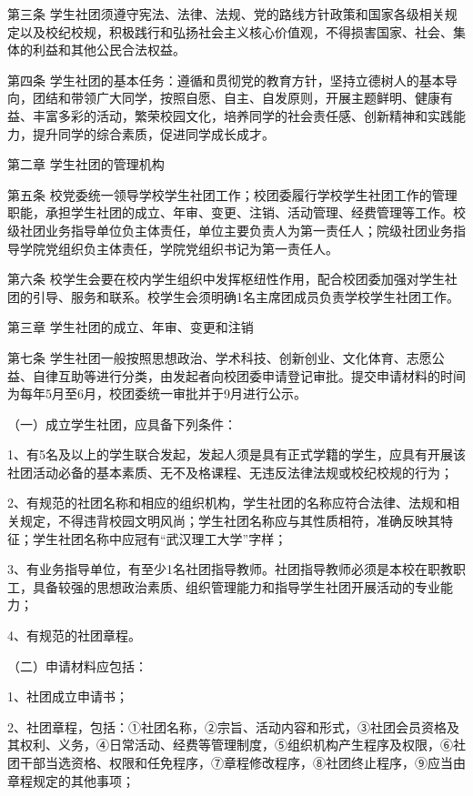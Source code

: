 \documentclass[UTF8,12pt,a4paper]{report}
\begin{document}
第三条  学生社团须遵守宪法、法律、法规、党的路线方针政策和国家各级相关规定以及校纪校规，积极践行和弘扬社会主义核心价值观，不得损害国家、社会、集体的利益和其他公民合法权益。

第四条  学生社团的基本任务：遵循和贯彻党的教育方针，坚持立德树人的基本导向，团结和带领广大同学，按照自愿、自主、自发原则，开展主题鲜明、健康有益、丰富多彩的活动，繁荣校园文化，培养同学的社会责任感、创新精神和实践能力，提升同学的综合素质，促进同学成长成才。



第二章  学生社团的管理机构

第五条  校党委统一领导学校学生社团工作；校团委履行学校学生社团工作的管理职能，承担学生社团的成立、年审、变更、注销、活动管理、经费管理等工作。校级社团业务指导单位负主体责任，单位主要负责人为第一责任人；院级社团业务指导学院党组织负主体责任，学院党组织书记为第一责任人。

第六条  校学生会要在校内学生组织中发挥枢纽性作用，配合校团委加强对学生社团的引导、服务和联系。校学生会须明确1名主席团成员负责学校学生社团工作。



第三章  学生社团的成立、年审、变更和注销

第七条  学生社团一般按照思想政治、学术科技、创新创业、文化体育、志愿公益、自律互助等进行分类，由发起者向校团委申请登记审批。提交申请材料的时间为每年5月至6月，校团委统一审批并于9月进行公示。

（一）成立学生社团，应具备下列条件：

1、有5名及以上的学生联合发起，发起人须是具有正式学籍的学生，应具有开展该社团活动必备的基本素质、无不及格课程、无违反法律法规或校纪校规的行为；

2、有规范的社团名称和相应的组织机构，学生社团的名称应符合法律、法规和相关规定，不得违背校园文明风尚；学生社团名称应与其性质相符，准确反映其特征；学生社团名称中应冠有“武汉理工大学”字样；

3、有业务指导单位，有至少1名社团指导教师。社团指导教师必须是本校在职教职工，具备较强的思想政治素质、组织管理能力和指导学生社团开展活动的专业能力；

4、有规范的社团章程。

（二）申请材料应包括：

1、社团成立申请书；

2、社团章程，包括：①社团名称，②宗旨、活动内容和形式，③社团会员资格及其权利、义务，④日常活动、经费等管理制度，⑤组织机构产生程序及权限，⑥社团干部当选资格、权限和任免程序，⑦章程修改程序，⑧社团终止程序，⑨应当由章程规定的其他事项；
\end{document}
